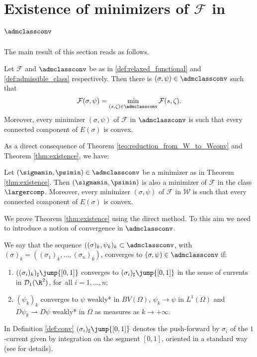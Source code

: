 \section{Existence of minimizers of \texorpdfstring{$\mathcal F$ in $\admclassconv$}{FW}}

\label{sec:existence_of_minimizers_of_F_in_Wconv}
The main result of this section reads as follows.

\begin{theorem}\label{thm:existence}
Let $\mathcal F$ and $\admclassconv$ be as in \eqref{def:relaxed_functional}
and \eqref{def:admissible_class} respectively. Then there
is $(\sigma, \psi)\in\admclassconv$ such that
\begin{equation}\label{eq:min_F_storto}
\mathcal F(\sigma,\psi)=
\min_{(s,\zeta)\in\admclassconv}\mathcal F(s,\zeta).
\end{equation}
Moreover, every minimizer $(\sigma, \psi)$ of $\mathcal F$ in $\admclassconv$ is such that every connected component of $E(\sigma)$ is convex.
\end{theorem}
As a direct consequence of Theorem \ref{teo:reduction_from_W_to_Wconv} and Theorem \eqref{thm:existence}, we have:

\begin{cor}\label{cor:mininmathcalW}
Let $(\sigmamin,\psimin)\in\admclassconv$ be a minimizer as in Theorem \ref{thm:existence}. Then $(\sigmamin,\psimin)$ is also a minimizer of ${\mathcal F}$ in the class $\largercomp$. Moreover, every minimizer $(\sigma, \psi)$ of $\mathcal F$ in $\mathcal W$ is such that every connected component of $E(\sigma)$ is convex.
\end{cor}

We prove Theorem \ref{thm:existence} using the direct method. To this aim
we need to introduce a notion of convergence in $\admclassconv$.
\begin{definition}
\label{def:conv}
We say that the sequence $((\sigma)_k,\psi_k)_k\subset \admclassconv
$, with $(\sigma)_k=((\sigma_1)_k,\dots,(\sigma_n)_k)$, converges to $(\sigma,\psi)\in \admclassconv$ if:
\begin{enumerate}[{\rm (a)},wide]
\item\label{a}
$((\sigma_{i})_k)_\sharp\jump{[0,1]}$ converges to
$(\sigma_i)_\sharp \jump{[0,1]}$ in the sense of currents in $\mathcal D_1(\R^2)$,
for~all $i=1,\dots,n$;
\item \label{b} $(\psi_k)_k$ converges
to $\psi$ weakly* in $BV(\Omega)$, \ie $\psi_k \to \psi$ in $L^1(\Omega)$ and
$D \psi_k \rightharpoonup D\psi$ weakly* in $\Omega$
as measures as
$k \to +\infty$.
\end{enumerate}
\end{definition}
In Definition \ref{def:conv} $(\sigma_i)_\sharp\jump{[0,1]}$ denotes the push-forward by $\sigma_i$ of the $1$-current given by integration on the segment $[0,1]$, oriented in a standard way (see \cite{Krantz-Parks} for details).

